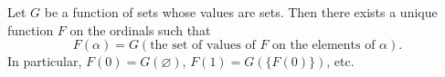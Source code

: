 Let $G$ be a function of sets whose values are sets. Then there exists a unique function $F$ on the ordinals such that
$$F(\alpha) = G(\text{the set of values of } F \text{ on the elements of } \alpha).$$
In particular, $F(0) = G(\varnothing)$, $F(1) = G(\{F(0)\})$, etc.
